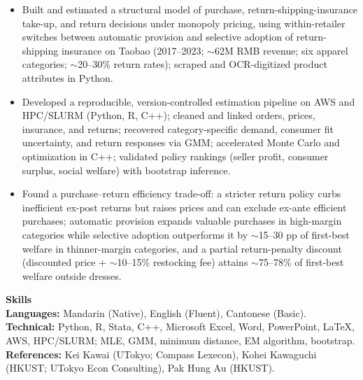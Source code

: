 \documentclass[11pt,letterpaper]{article}
\begin{document}
\begin{itemize}
  \item Built and estimated a structural model of purchase, return-shipping-insurance take-up, and return decisions under monopoly pricing, using within-retailer switches between automatic provision and selective adoption of return-shipping insurance on Taobao (2017--2023; \(\sim\)62M RMB revenue; six apparel categories; \(\sim\)20--30\% return rates); scraped and OCR-digitized product attributes in Python.
  \item Developed a reproducible, version-controlled estimation pipeline on AWS and HPC/SLURM (Python, R, C++); cleaned and linked orders, prices, insurance, and returns; recovered category-specific demand, consumer fit uncertainty, and return responses via GMM; accelerated Monte Carlo and optimization in C++; validated policy rankings (seller profit, consumer surplus, social welfare) with bootstrap inference.
  \item Found a purchase--return efficiency trade-off: a stricter return policy curbs inefficient ex-post returns but raises prices and can exclude ex-ante efficient purchases; automatic provision expands valuable purchases in high-margin categories while selective adoption outperforms it by \(\sim\)15--30 pp of first-best welfare in thinner-margin categories, and a partial return-penalty discount (discounted price + \(\sim\)10--15\% restocking fee) attains \(\sim\)75--78\% of first-best welfare outside dresses.
\end{itemize}

\vspace{0.15pt}

{\large \textbf{Skills}}\\[-0.5pt]
\textbf{Languages:} Mandarin (Native), English (Fluent), Cantonese (Basic).\\
\textbf{Technical:} Python, R, Stata, C++, Microsoft Excel, Word, PowerPoint, \LaTeX, AWS, HPC/SLURM; MLE, GMM, minimum distance, EM algorithm, bootstrap.\\
\textbf{References:} Kei Kawai (UTokyo; Compass Lexecon), Kohei Kawaguchi (HKUST; UTokyo Econ Consulting), Pak Hung Au (HKUST).
\end{document}
